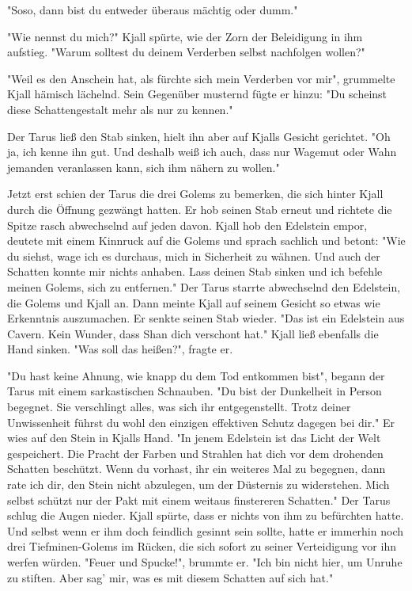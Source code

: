 \documentclass[10pt, a4paper, oneside]{book}
\begin{document}
\begin{multicols}{2}
"Soso, dann bist du entweder überaus mächtig oder dumm."\bigskip

"Wie nennst du mich?" Kjall spürte, wie der Zorn der Beleidigung in ihm aufstieg. "Warum solltest du deinem Verderben selbst nachfolgen wollen?"\bigskip

"Weil es den Anschein hat, als fürchte sich mein Verderben vor mir", grummelte Kjall hämisch lächelnd. Sein Gegenüber musternd fügte er hinzu: "Du scheinst diese Schattengestalt mehr als nur zu kennen."\bigskip

Der Tarus ließ den Stab sinken, hielt ihn aber auf Kjalls Gesicht gerichtet. "Oh ja, ich kenne ihn gut. Und deshalb weiß ich auch, dass nur Wagemut oder Wahn jemanden veranlassen kann, sich ihm nähern zu wollen."\bigskip

Jetzt erst schien der Tarus die drei Golems zu bemerken, die sich hinter Kjall durch die Öffnung gezwängt hatten. Er hob seinen Stab erneut und richtete die Spitze rasch abwechselnd auf jeden davon. Kjall hob den Edelstein empor, deutete mit einem Kinnruck auf die Golems und sprach sachlich und betont: "Wie du siehst, wage ich es durchaus, mich in Sicherheit zu wähnen. Und auch der Schatten konnte mir nichts anhaben. Lass deinen Stab sinken und ich befehle meinen Golems, sich zu entfernen." Der Tarus starrte abwechselnd den Edelstein, die Golems und Kjall an. Dann meinte Kjall auf seinem Gesicht so etwas wie Erkenntnis auszumachen. Er senkte seinen Stab wieder. "Das ist ein Edelstein aus Cavern. Kein Wunder, dass Shan dich verschont hat." Kjall ließ ebenfalls die Hand sinken. "Was soll das heißen?", fragte er.\bigskip

"Du hast keine Ahnung, wie knapp du dem Tod entkommen bist", begann der Tarus mit einem sarkastischen Schnauben. "Du bist der Dunkelheit in Person begegnet. Sie verschlingt alles, was sich ihr entgegenstellt. Trotz deiner Unwissenheit führst du wohl den einzigen effektiven Schutz dagegen bei dir." Er wies auf den Stein in Kjalls Hand. "In jenem Edelstein ist das Licht der Welt gespeichert. Die Pracht der Farben und Strahlen hat dich vor dem drohenden Schatten beschützt. Wenn du vorhast, ihr ein weiteres Mal zu begegnen, dann rate ich dir, den Stein nicht abzulegen, um der Düsternis zu widerstehen. Mich selbst schützt nur der Pakt mit einem weitaus finstereren Schatten." Der Tarus schlug die Augen nieder. Kjall spürte, dass er nichts von ihm zu befürchten hatte. Und selbst wenn er ihm doch feindlich gesinnt sein sollte, hatte er immerhin noch drei Tiefminen-Golems im Rücken, die sich sofort zu seiner Verteidigung vor ihn werfen würden. "Feuer und Spucke!", brummte er. "Ich bin nicht hier, um Unruhe zu stiften. Aber sag’ mir, was es mit diesem Schatten auf sich hat."\bigskip


\end{multicols}
\end{document}
